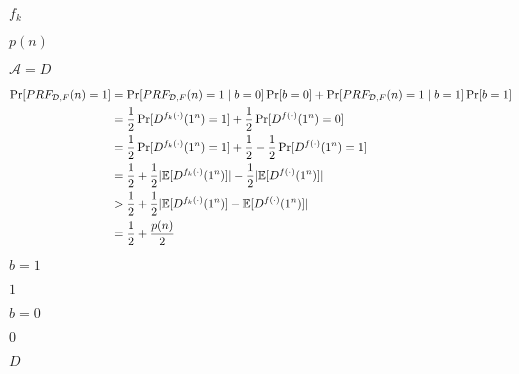 \documentclass[10pt]{book}
\begin{document}
\begin{mdSnippets}
\begin{mdInlineSnippet}[f55fcd9745b34e40639d81c49eb07a8e]
$f_k$\end{mdInlineSnippet}%
\begin{mdInlineSnippet}%
$p(n)$\end{mdInlineSnippet}%
\begin{mdInlineSnippet}[df3471d15534c2b765a8ed24474a6a3b]%
$\mathcal{A} = D$\end{mdInlineSnippet}%
\begin{mdDisplaySnippet}[a9310c72f9c7765e78d8d164b6640358]%
\[%
\begin{aligned}
\Pr[PRF_{\mathcal{D},F}(n) = 1] &= \Pr[PRF_{\mathcal{D},F}(n) = 1 \mid b = 0]\Pr[b = 0] + \Pr[PRF_{\mathcal{D},F}(n) = 1 \mid b = 1]\Pr[b = 1] \\
&= \frac{1}{2}\Pr[D^{f_k(\cdot)}(1^n) = 1] + \frac{1}{2}\Pr[D^{f(\cdot)}(1^n) = 0] \\
&= \frac{1}{2}\Pr[D^{f_k(\cdot)}(1^n) = 1] + \frac{1}{2} - \frac{1}{2}\Pr[D^{f(\cdot)}(1^n) = 1] \\
&=  \frac{1}{2} + \frac{1}{2}|\E[D^{f_k(\cdot)}(1^n)]| - \frac{1}{2}|\E[D^{f(\cdot)}(1^n)]| \\
&> \frac{1}{2} + \frac{1}{2}|\E[D^{f_k(\cdot)}(1^n)] - \E[D^{f(\cdot)}(1^n)]| \\
&= \frac{1}{2} + \frac{p(n)}{2}
\end{aligned}
\]%
\end{mdDisplaySnippet}%
\begin{mdInlineSnippet}[3c94d884933477acdc14fc70da4b987a]%
$b=1$\end{mdInlineSnippet}%
\begin{mdInlineSnippet}[c4ca4238a0b923820dcc509a6f75849b]%
$1$\end{mdInlineSnippet}%
\begin{mdInlineSnippet}[2cd846c62474f70be3291ce24c1bcf6a]%
$b = 0$\end{mdInlineSnippet}%
\begin{mdInlineSnippet}%
$0$\end{mdInlineSnippet}%
\begin{mdInlineSnippet}[f623e75af30e62bbd73d6df5b50bb7b5]%
$D$\end{mdInlineSnippet}%
\begin{mdInlineSnippet}[83878c91171338902e0fe0fb97a8c47a]%

\end{mdInlineSnippet}
\end{mdSnippets}
\end{document}
